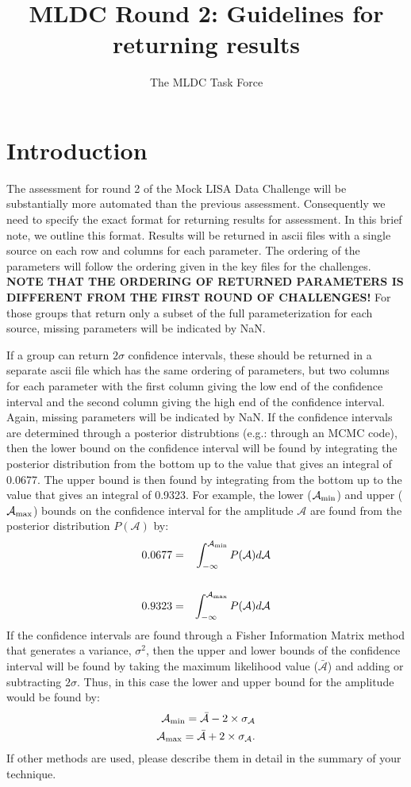 \documentclass[11pt]{article}
\title{MLDC Round 2: Guidelines for returning results}
\author{The MLDC Task Force}
\begin{document}
\maketitle
\section{Introduction}
The assessment for round 2 of the Mock LISA Data Challenge will be substantially more automated than the previous assessment. Consequently we need to specify the exact format for returning results for assessment. In this brief note, we outline this format. Results will be returned in ascii files with a single source on each row and columns for each parameter. The ordering of the parameters will follow the ordering given in the key files for the challenges. {\bf NOTE THAT THE ORDERING OF RETURNED PARAMETERS IS DIFFERENT FROM THE FIRST ROUND OF CHALLENGES!} For those groups that return only a subset of the full parameterization for each source, missing parameters will be indicated by NaN. 

If a group can return $2\sigma$ confidence intervals, these should be returned in a separate ascii file which has the same ordering of parameters, but two columns for each parameter with the first column giving the low end of the confidence interval and the second column giving the high end of the confidence interval. Again, missing parameters will be indicated by NaN. If the confidence intervals are determined through a posterior distrubtions (e.g.: through an MCMC code), then the lower bound on the confidence interval will be found by integrating the posterior distribution from the bottom up to the value that gives an integral of 0.0677. The upper bound is then found by integrating from the bottom up to the value that gives an integral of 0.9323. For example, the lower ($\mathcal{A}_{\rm min}$) and upper ($\mathcal{A}_{\rm max}$) bounds on the confidence interval for the amplitude $\mathcal{A}$ are found from the posterior distribution $P(\mathcal{A})$ by:
\begin{eqnarray}
0.0677 & = & \int_{-\infty}^{\mathcal{A}_{\rm min}}{P(\mathcal{A})d\mathcal{A}} \\
\nonumber \\
0.9323 & = & \int_{-\infty}^{\mathcal{A}_{\rm max}}{P(\mathcal{A})d\mathcal{A}} \\
\end{eqnarray}
If the confidence intervals are found through a Fisher Information Matrix method that generates a variance, $\sigma^2$, then the upper and lower bounds of the confidence interval will be found by taking the maximum likelihood value ($\bar{\mathcal{A}}$) and adding or subtracting $2\sigma$. Thus, in this case the lower and upper bound for the amplitude would be found by:
\begin{eqnarray}
\mathcal{A}_{\rm min} = \bar{\mathcal{A}} - 2 \times \sigma_{\mathcal{A}} \\
\mathcal{A}_{\rm max} = \bar{\mathcal{A}} + 2 \times \sigma_{\mathcal{A}}.
\end{eqnarray}
If other methods are used, please describe them in detail in the summary of your technique.
\end{document}
